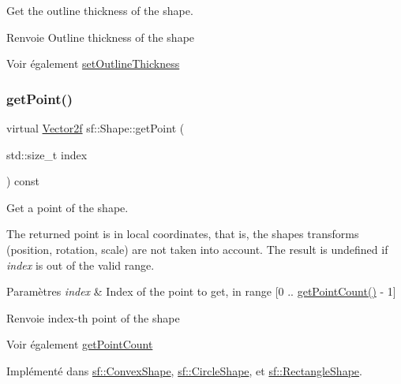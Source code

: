 Get the outline thickness of the shape. 

\begin{DoxyReturn}{Renvoie}
Outline thickness of the shape
\end{DoxyReturn}
\begin{DoxySeeAlso}{Voir également}
\hyperlink{classsf_1_1Shape_a5ad336ad74fc1f567fce3b7e44cf87dc}{set\+Outline\+Thickness} 
\end{DoxySeeAlso}
\mbox{\label{classsf_1_1Shape_a40e5d83713eb9f0c999944cf96458085}} 
\subsubsection{\texorpdfstring{get\+Point()}{getPoint()}}
{\footnotesize\ttfamily virtual \hyperlink{classsf_1_1Vector2}{Vector2f} sf\+::\+Shape\+::get\+Point (\begin{DoxyParamCaption}\item[{std\+::size\+\_\+t}]{index }\end{DoxyParamCaption}) const\hspace{0.3cm}{\ttfamily [pure virtual]}}



Get a point of the shape. 

The returned point is in local coordinates, that is, the shape\textquotesingle{}s transforms (position, rotation, scale) are not taken into account. The result is undefined if {\itshape index} is out of the valid range.


\begin{DoxyParams}{Paramètres}
{\em index} & Index of the point to get, in range \mbox{[}0 .. \hyperlink{classsf_1_1Shape_af988dd61a29803fc04d02198e44b5643}{get\+Point\+Count()} -\/ 1\mbox{]}\\
\hline
\end{DoxyParams}
\begin{DoxyReturn}{Renvoie}
index-\/th point of the shape
\end{DoxyReturn}
\begin{DoxySeeAlso}{Voir également}
\hyperlink{classsf_1_1Shape_af988dd61a29803fc04d02198e44b5643}{get\+Point\+Count} 
\end{DoxySeeAlso}


Implémenté dans \hyperlink{classsf_1_1ConvexShape_a72a97bc426d8daf4d682a20fcb7f3fe7}{sf\+::\+Convex\+Shape}, \hyperlink{classsf_1_1CircleShape_a2d7f9715502b960b92387102fddb8736}{sf\+::\+Circle\+Shape}, et \hyperlink{classsf_1_1RectangleShape_a3909f1a1946930ff5ae17c26206c0f81}{sf\+::\+Rectangle\+Shape}.

